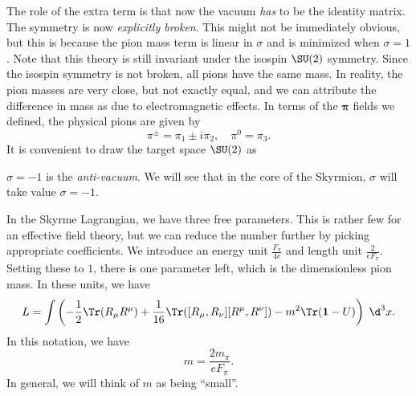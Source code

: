 \documentclass[a4paper]{article}
\begin{document}
The role of the extra term is that now the vacuum \emph{has} to be the identity matrix. The symmetry is now \emph{explicitly broken}. This might not be immediately obvious, but this is because the pion mass term is linear in $\sigma$ and is minimized when $\sigma = 1$. Note that this theory is still invariant under the isospin $\SU(2)$ symmetry. Since the isospin symmetry is not broken, all pions have the same mass. In reality, the pion masses are very close, but not exactly equal, and we can attribute the difference in mass as due to electromagnetic effects. In terms of the $\boldsymbol\pi$ fields we defined, the physical pions are given by
\[
  \pi^{\pm} = \pi_1 \pm i \pi_2,\quad \pi^0 = \pi_3.
\]
It is convenient to draw the target space $\SU(2)$ as
\begin{center}
\end{center}
$\sigma = -1$ is the \emph{anti-vacuum}. We will see that in the core of the Skyrmion, $\sigma$ will take value $\sigma = -1$.

In the Skyrme Lagrangian, we have three free parameters. This is rather few for an effective field theory, but we can reduce the number further by picking appropriate coefficients. We introduce an energy unit $\frac{F_\pi}{4e}$ and length unit $\frac{2}{eF_\pi}$. Setting these to $1$, there is one parameter left, which is the dimensionless pion mass. In these units, we have
\[
  L = \int \left(-\frac{1}{2}\Tr(R_\mu R^\mu) + \frac{1}{16} \Tr([R_\mu, R_\nu][R^\mu, R^\nu]) - m^2 \Tr(\mathbf{1} - U)\right)\;\d^3 x.
\]
In this notation, we have
\[
  m = \frac{2m_\pi}{e F_\pi}.
\]
In general, we will think of $m$ as being ``small''.
\end{document}
